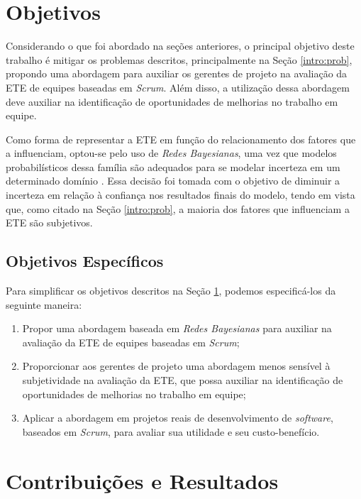 \section{Objetivos}
\label{intro:obj}

Considerando o que foi abordado na seções anteriores, o principal objetivo deste trabalho é mitigar os problemas descritos, principalmente na Seção \ref{intro:prob}, propondo uma abordagem para auxiliar os gerentes de projeto na avaliação da ETE de equipes baseadas em \textit{Scrum}. Além disso, a utilização dessa abordagem deve auxiliar na identificação de oportunidades de melhorias no trabalho em equipe.

Como forma de representar a ETE em função do relacionamento dos fatores que a influenciam, optou-se pelo uso de \textit{Redes Bayesianas}, uma vez que modelos probabilísticos dessa família são adequados para se modelar incerteza em um determinado domínio \cite{bengal}. Essa decisão foi tomada com o objetivo de diminuir a incerteza em relação à confiança nos resultados finais do modelo, tendo em vista que, como citado na Seção \ref{intro:prob}, a maioria dos fatores que influenciam a ETE são subjetivos.

\subsection{Objetivos Específicos}
\label{intro:obj:esp}

Para simplificar os objetivos descritos na Seção \ref{intro:obj}, podemos especificá-los da seguinte maneira:

\begin{enumerate}
  \item Propor uma abordagem baseada em \textit{Redes Bayesianas} para auxiliar na avaliação da ETE de equipes baseadas em \textit{Scrum};
  \item Proporcionar aos gerentes de projeto uma abordagem menos sensível à subjetividade na avaliação da ETE, que possa auxiliar na identificação de oportunidades de melhorias no trabalho em equipe;
  \item Aplicar a abordagem em projetos reais de desenvolvimento de \textit{software}, baseados em \textit{Scrum}, para avaliar sua utilidade e seu custo-benefício.
\end{enumerate}

\section{Contribuições e Resultados}
\label{intro:result}

